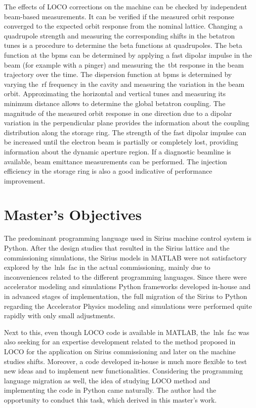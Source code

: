 The effects of LOCO corrections on the machine can be checked by independent beam-based measurements. It can be verified if the measured orbit response converged to the expected orbit response from the nominal lattice. Changing a quadrupole strength and measuring the corresponding shifts in the betatron tunes is a procedure to determine the beta functions at quadrupoles. The beta function at the \glspl{bpm} can be determined by applying a fast dipolar impulse in the beam (for example with a pinger) and measuring the~\gls{tbt} response in the beam trajectory over the time. The dispersion function at \glspl{bpm} is determined by varying the~\gls{rf} frequency in the cavity and measuring the variation in the beam orbit. Approximating the horizontal and vertical tunes and measuring its minimum distance allows to determine the global betatron coupling. The magnitude of the measured orbit response in one direction due to a dipolar variation in the perpendicular plane provides the information about the coupling distribution along the storage ring. The strength of the fast dipolar impulse can be increased until the electron beam is partially or completely lost, providing information about the dynamic aperture region. If a diagnostic beamline is available, beam emittance measurements can be performed. The injection efficiency in the storage ring is also a good indicative of performance improvement.
\section{Master's Objectives}\label{sec:master_obj}
The predominant programming language used in Sirius machine control system is Python. After the design studies that resulted in the Sirius lattice and the commissioning simulations, the Sirius models in MATLAB were not satisfactory explored by the~\gls{lnls}~\gls{fac} in the actual commissioning, mainly due to inconveniences related to the different programming languages. Since there were accelerator modeling and simulations Python frameworks developed in-house and in advanced stages of implementation, the full migration of the Sirius to Python regarding the Accelerator Physics modeling and simulations were performed quite rapidly with only small adjustments.
 
Next to this, even though LOCO code is available in MATLAB, the~\gls{lnls}~\gls{fac} was also seeking for an expertise development related to the method proposed in LOCO for the application on Sirius commissioning and later on the machine studies shifts. Moreover, a code developed in-house is much more flexible to test new ideas and to implement new functionalities. Considering the programming language migration as well, the idea of studying LOCO method and implementing the code in Python came naturally. The author had the opportunity to conduct this task, which derived in this master's work. 

